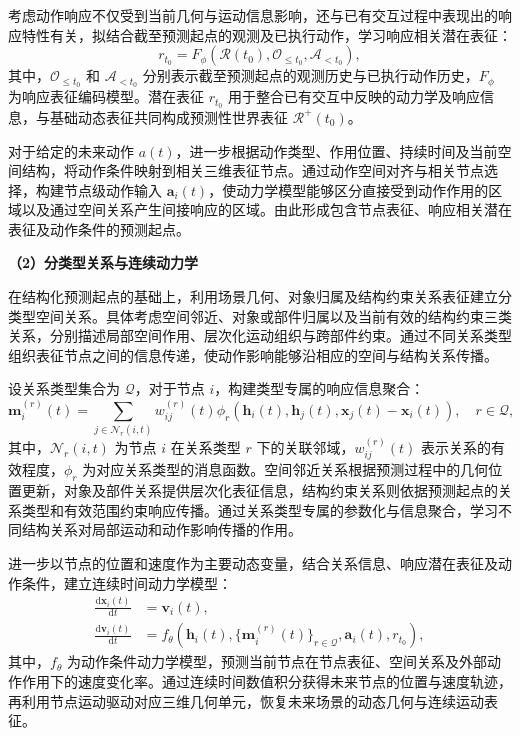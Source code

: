 考虑动作响应不仅受到当前几何与运动信息影响，还与已有交互过程中表现出的响应特性有关，拟结合截至预测起点的观测及已执行动作，学习响应相关潜在表征：
\begin{equation}
  r_{t_0}
  =
  F_{\phi}
  \left(
    \mathcal{R}(t_0),
    \mathcal{O}_{\leq t_0},
    \mathcal{A}_{<t_0}
  \right),
  \label{eq:route-response-latent-representation}
\end{equation}
其中，$\mathcal{O}_{\leq t_0}$ 和 $\mathcal{A}_{<t_0}$ 分别表示截至预测起点的观测历史与已执行动作历史，$F_{\phi}$ 为响应表征编码模型。潜在表征 $r_{t_0}$ 用于整合已有交互中反映的动力学及响应信息，与基础动态表征共同构成预测性世界表征 $\mathcal{R}^{+}(t_0)$。

对于给定的未来动作 $a(t)$，进一步根据动作类型、作用位置、持续时间及当前空间结构，将动作条件映射到相关三维表征节点。通过动作空间对齐与相关节点选择，构建节点级动作输入 $\mathbf{a}_i(t)$，使动力学模型能够区分直接受到动作作用的区域以及通过空间关系产生间接响应的区域。由此形成包含节点表征、响应相关潜在表征及动作条件的预测起点。

\noindent\textbf{（2）分类型关系与连续动力学}

在结构化预测起点的基础上，利用场景几何、对象归属及结构约束关系表征建立分类型空间关系。具体考虑空间邻近、对象或部件归属以及当前有效的结构约束三类关系，分别描述局部空间作用、层次化运动组织与跨部件约束。通过不同关系类型组织表征节点之间的信息传递，使动作影响能够沿相应的空间与结构关系传播。

设关系类型集合为 $\mathcal{Q}$，对于节点 $i$，构建类型专属的响应信息聚合：
\begin{equation}
  \mathbf{m}_i^{(r)}(t)
  =
  \sum_{j\in\mathcal{N}_r(i,t)}
  w_{ij}^{(r)}(t)
  \phi_r\left(
    \mathbf{h}_i(t),
    \mathbf{h}_j(t),
    \mathbf{x}_j(t)-\mathbf{x}_i(t)
  \right),
  \quad r\in\mathcal{Q},
  \label{eq:route-response-relation-message}
\end{equation}
其中，$\mathcal{N}_r(i,t)$ 为节点 $i$ 在关系类型 $r$ 下的关联邻域，$w_{ij}^{(r)}(t)$ 表示关系的有效程度，$\phi_r$ 为对应关系类型的消息函数。空间邻近关系根据预测过程中的几何位置更新，对象及部件关系提供层次化表征信息，结构约束关系则依据预测起点的关系类型和有效范围约束响应传播。通过关系类型专属的参数化与信息聚合，学习不同结构关系对局部运动和动作影响传播的作用。

进一步以节点的位置和速度作为主要动态变量，结合关系信息、响应潜在表征及动作条件，建立连续时间动力学模型：
\begin{equation}
  \begin{aligned}
  \frac{\mathrm{d}\mathbf{x}_i(t)}{\mathrm{d}t}
  &=
  \mathbf{v}_i(t),\\
  \frac{\mathrm{d}\mathbf{v}_i(t)}{\mathrm{d}t}
  &=
  f_{\theta}\left(
    \mathbf{h}_i(t),
    \{\mathbf{m}_i^{(r)}(t)\}_{r\in\mathcal{Q}},
    \mathbf{a}_i(t),
    r_{t_0}
  \right),
  \end{aligned}
  \label{eq:route-response-continuous-dynamics}
\end{equation}
其中，$f_{\theta}$ 为动作条件动力学模型，预测当前节点在节点表征、空间关系及外部动作作用下的速度变化率。通过连续时间数值积分获得未来节点的位置与速度轨迹，再利用节点运动驱动对应三维几何单元，恢复未来场景的动态几何与连续运动表征。


